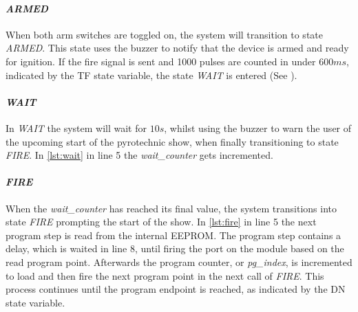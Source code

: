 

\paragraph{\textit{ARMED}}
When both arm switches are toggled on, the system will transition to state \textit{ARMED}. This state uses the buzzer to notify that the device is armed and ready for ignition. If the fire signal is sent and 1000 pulses are counted in under $600ms$, indicated by the TF state variable, the state \textit{WAIT} is entered (See ).



\paragraph{\textit{WAIT}}

In \textit{WAIT} the system will wait for $10s$, whilst using the buzzer to warn the user of the upcoming start of the pyrotechnic show, when finally transitioning to state \textit{FIRE}. In \cref{lst:wait} in line 5 the \textit{wait\_counter} gets incremented. 



\pagebreak

\paragraph{\textit{FIRE}}
When the \textit{wait\_counter} has reached its final value, the system transitions into state \textit{FIRE} prompting the start of the show. In \cref{lst:fire} in line 5 the next program step is read from the internal EEPROM. The program step contains a delay, which is waited in line 8, until firing the port on the module based on the read program point. Afterwards the program counter, or \textit{pg\_index}, is incremented to load and then fire the next program point in the next call of \textit{FIRE}. This process continues until the program endpoint is reached, as indicated by the DN state variable.\\

